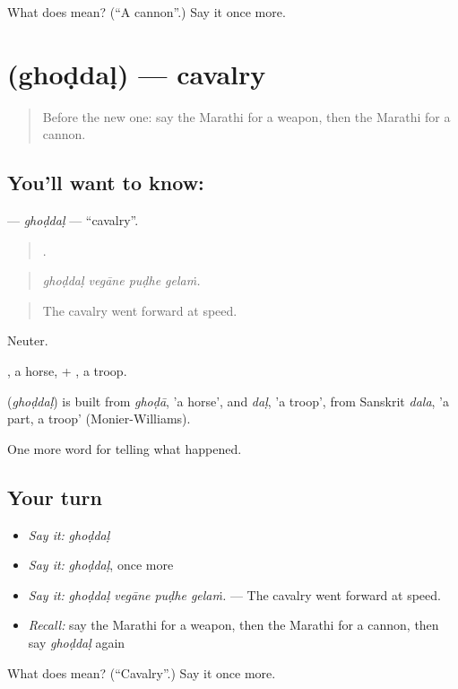 \begin{tcolorbox}[breakable,colback=teal!4,colframe=teal!35!black,title={Before you move on}]
What does  mean? (\textquotedblleft{}A cannon\textquotedblright{}.) Say it once more.
\end{tcolorbox}
\section[\texorpdfstring{\mr{घोडदळ} (ghoḍdaḷ)}{घोडदळ (ghoḍdaḷ)}]{ (ghoḍdaḷ) — cavalry}

\label{lesson:MR-C329-ghoddal}



\begin{quote}
Before the new one: say the Marathi for a weapon, then the Marathi for a cannon.
\end{quote}

\subsection*{You'll want to know: }
\textbf{} — \emph{ghoḍdaḷ} — \textquotedblleft{}cavalry\textquotedblright{}.

\begin{quote}
   .
\end{quote}

\begin{quote}
\emph{ghoḍdaḷ vegāne puḍhe gelaṁ.}
\end{quote}

\begin{quote}
The cavalry went forward at speed.
\end{quote}

Neuter.

, a horse, + , a troop.

\begin{cousinweb}
\textbf{} (\emph{ghoḍdaḷ}) is built from \emph{ghoḍā}, 'a horse', and \emph{daḷ}, 'a troop', from Sanskrit \emph{dala}, 'a part, a troop' (Monier-Williams).
\end{cousinweb}

\begin{grammarlens}[title={What you've built}]
One more word for telling what happened.
\end{grammarlens}

\subsection*{Your turn}
\begin{itemize}
\raggedright
  \item \emph{Say it:} \emph{ghoḍdaḷ}
  \item \emph{Say it:} \emph{ghoḍdaḷ}, once more
  \item \emph{Say it:} \emph{ghoḍdaḷ vegāne puḍhe gelaṁ.} — The cavalry went forward at speed.
  \item \emph{Recall:} say the Marathi for a weapon, then the Marathi for a cannon, then say \emph{ghoḍdaḷ} again
\end{itemize}

\begin{tcolorbox}[breakable,colback=teal!4,colframe=teal!35!black,title={Before you move on}]
What does  mean? (\textquotedblleft{}Cavalry\textquotedblright{}.) Say it once more.
\end{tcolorbox}
